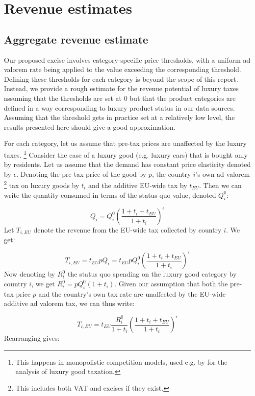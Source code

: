 \documentclass{article}
\begin{document}
\section{Revenue estimates}

\subsection{Aggregate revenue estimate}

Our proposed excise involves category-specific price thresholds, with a uniform ad valorem rate being applied to the value exceeding the corresponding threshold. Defining these thresholds for each category is beyond the scope of this report. Instead, we provide a rough estimate for the revenue potential of luxury taxes assuming %
that the thresholds are set at 0 but that the product categories are defined in a way corresponding to luxury product status in our data sources. Assuming that the threshold gets in practice set at a relatively low level, the results presented here should give a good approximation.

For each category, let us assume that pre-tax prices are unaffected by the luxury taxes. \footnote{This happens in monopolistic competition models, used e.g. by \citet{Xie2026} for the analysis of luxury good taxation.} Consider the case of a luxury good (e.g. luxury cars) that is bought only by residents. Let us assume that the demand has constant price elasticity denoted by $\epsilon$.  Denoting the pre-tax price of the good by $p$, the country $i$'s own ad valorem \footnote{This includes both VAT and excises if they exist.} tax on luxury goods by $t_{i}$ and the additive EU-wide tax by $t_{EU}$. Then we can write the quantity consumed in terms of the status quo value, denoted $Q_i^0$:

\[
Q_i=Q_i^0 \left(\frac{1+t_i+t_{EU}}{1+t_i}\right)^{\epsilon}
\]
Let $T_{i,EU}$ denote the revenue from the EU-wide tax collected by country $i$. We get:

\[
T_{i,EU}=t_{EU} p Q_i=t_{EU} p Q_i^0 \left(\frac{1+t_i+t_{EU}}{1+t_i}\right)^{\epsilon}
\]
Now denoting by $R_i^0$ the status quo spending on the luxury good category by country $i$, we get $R_i^0=p Q_i^0 (1+t_i)$. Given our assumption that both the pre-tax price $p$ and the country's own tax rate are unaffected by the EU-wide additive ad valorem tax, we can thus write:

\[
T_{i,EU}=t_{EU} \frac{R_i^0}{1+t_i} \left(\frac{1+t_i+t_{EU}}{1+t_i}\right)^{\epsilon}
\]
Rearranging gives:
\end{document}
